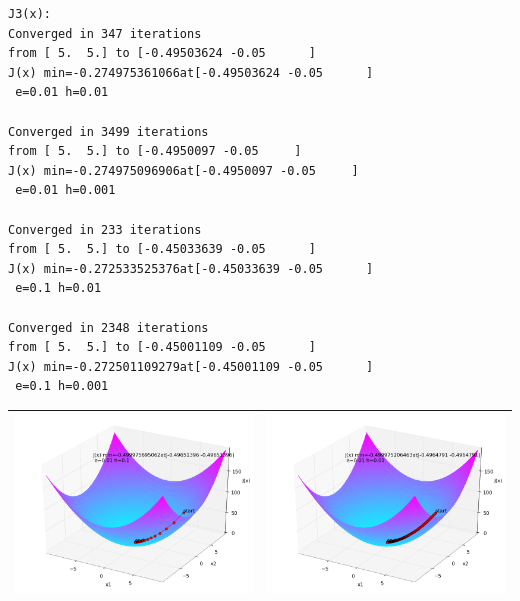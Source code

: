 \begin{itemize}
\begin{verbatim}
J3(x):
Converged in 347 iterations
from [ 5.  5.] to [-0.49503624 -0.05      ]
J(x) min=-0.274975361066at[-0.49503624 -0.05      ]
 e=0.01 h=0.01

Converged in 3499 iterations
from [ 5.  5.] to [-0.4950097 -0.05     ]
J(x) min=-0.274975096906at[-0.4950097 -0.05     ]
 e=0.01 h=0.001

Converged in 233 iterations
from [ 5.  5.] to [-0.45033639 -0.05      ]
J(x) min=-0.272533525376at[-0.45033639 -0.05      ]
 e=0.1 h=0.01

Converged in 2348 iterations
from [ 5.  5.] to [-0.45001109 -0.05      ]
J(x) min=-0.272501109279at[-0.45001109 -0.05      ]
 e=0.1 h=0.001
\end{verbatim}


\begin{table}[ht]
\centering
\begin{tabular}{|c|c|}
\hline
\includegraphics[width=8cm]{J1_1.png}&\includegraphics[width=8cm]{J1_2.png}\\
\hline

\end{tabular}
\end{table}
\end{itemize}
